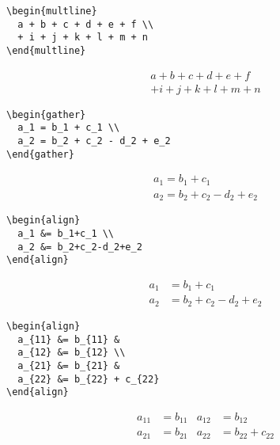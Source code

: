 \begin{table}[p]
  \begin{eqxample}
\begin{lstlisting}
\begin{multline}
  a + b + c + d + e + f \\
  + i + j + k + l + m + n
\end{multline}
\end{lstlisting}
    \producing
    \begin{multline}
      a+b+c+d+e+f\\
      +i+j+k+l+m+n
    \end{multline}
  \end{eqxample}

  \begin{eqxample}
\begin{lstlisting}
\begin{gather}
  a_1 = b_1 + c_1 \\
  a_2 = b_2 + c_2 - d_2 + e_2
\end{gather}
\end{lstlisting}
    \producing
    \begin{gather}
      a_1=b_1+c_1\\
      a_2=b_2+c_2-d_2+e_2
    \end{gather}
  \end{eqxample}

  \begin{eqxample}
\begin{lstlisting}
\begin{align}
  a_1 &= b_1+c_1 \\
  a_2 &= b_2+c_2-d_2+e_2
\end{align}
\end{lstlisting}
    \producing
    \begin{align}
      a_1& =b_1+c_1\\
      a_2& =b_2+c_2-d_2+e_2
    \end{align}
  \end{eqxample}

  \begin{eqxample}
\begin{lstlisting}
\begin{align}
  a_{11} &= b_{11} &
  a_{12} &= b_{12} \\
  a_{21} &= b_{21} &
  a_{22} &= b_{22} + c_{22}
\end{align}
\end{lstlisting}
    \producing
    \begin{align}
      a_{11}& =b_{11}&
      a_{12}& =b_{12}\\
      a_{21}& =b_{21}&
      a_{22}& =b_{22}+c_{22}
    \end{align}
  \end{eqxample}
\end{table}


